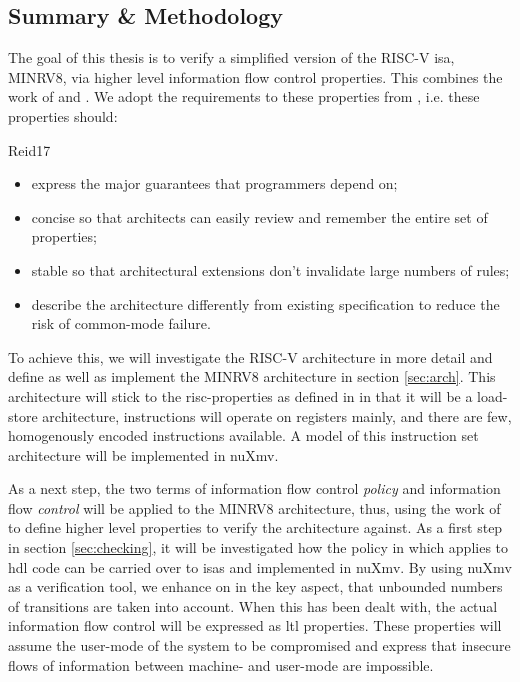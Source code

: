 \subsection{Summary \& Methodology}
\label{sec:sum-background}

The goal of this thesis is to verify a simplified version of the RISC-V \gls{isa}, MINRV8, via higher level information flow control properties.
This combines the work of \citeauthor{Reid17} \cite{Reid17} and \citeauthor{Ferraiuolo17} \cite{Ferraiuolo17}.
We adopt the requirements to these properties from \cite{Reid17}, i.e. these properties should:
\begin{displaycquote}[pp.88:2-3]{Reid17}
    \begin{itemize}
        \item express the major guarantees that programmers depend on;
        \item {} concise so that architects can easily review and remember the entire set of properties;
        \item {} stable so that architectural extensions don't invalidate large numbers of rules;
        \item \textelp{} describe the architecture differently from existing specification to reduce the risk of common-mode failure.
    \end{itemize}
\end{displaycquote}

To achieve this, we will investigate the RISC-V architecture in more detail and define as well as implement the MINRV8 architecture in section \ref{sec:arch}.
This architecture will stick to the \gls{risc}-properties as defined in \cite{Hennessy12} in that it will be a load-store architecture, instructions will operate on registers mainly, and there are few, homogenously encoded instructions available.
A model of this instruction set architecture will be implemented in nuXmv.

As a next step, the two terms of information flow control \textit{policy} and information flow \textit{control} will be applied to the MINRV8 architecture, thus, using the work of \citeauthor{Ferraiuolo17} \cite{Ferraiuolo17} to define higher level properties to verify the architecture against.
As a first step in section \ref{sec:checking}, it will be investigated how the policy in \cite{Ferraiuolo17} which applies to \gls{hdl} code can be carried over to \glspl{isa} and implemented in nuXmv.
By using nuXmv as a verification tool, we enhance on \cite{Reid17} in the key aspect, that unbounded numbers of transitions are taken into account.
When this has been dealt with, the actual information flow control will be expressed as \gls{ltl} properties.
These properties will assume the user-mode of the system to be compromised and express that insecure flows of information between machine- and user-mode are impossible.

